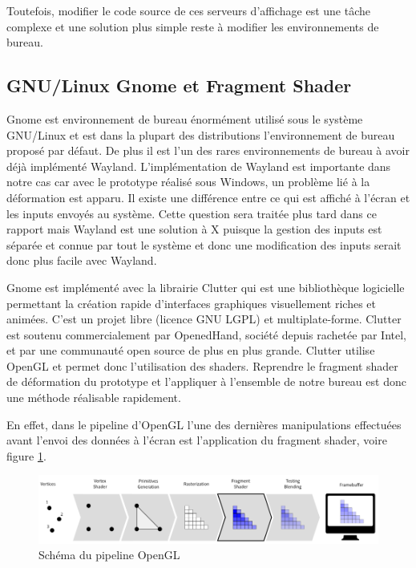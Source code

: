 Toutefois, modifier le code source de ces serveurs d'affichage est une tâche complexe et une solution plus simple reste à modifier les environnements de bureau.

\subsection{GNU/Linux Gnome et Fragment Shader}

Gnome est environnement de bureau énormément utilisé sous le système GNU/Linux et est dans la plupart des distributions l'environnement de bureau proposé par défaut. De plus il est l'un des rares environnements de bureau à avoir déjà implémenté Wayland. L'implémentation de Wayland est importante dans notre cas car avec le prototype réalisé sous Windows, un problème lié à la déformation est apparu. Il existe une différence entre ce qui est affiché à l'écran et les inputs envoyés au système. Cette question sera traitée plus tard dans ce rapport mais Wayland est une solution à X puisque la gestion des inputs est séparée et connue par tout le système et donc une modification des inputs serait donc plus facile avec Wayland.

Gnome est implémenté avec la librairie Clutter qui est une bibliothèque logicielle permettant la création rapide d'interfaces graphiques visuellement riches et animées. C'est un projet libre (licence GNU LGPL) et multiplate-forme. Clutter est soutenu commercialement par OpenedHand, société depuis rachetée par Intel, et par une communauté open source de plus en plus grande. Clutter utilise OpenGL et permet donc l'utilisation des shaders. Reprendre le fragment shader de déformation du prototype et l'appliquer à l'ensemble de notre bureau est donc une méthode réalisable rapidement.

En effet, dans le pipeline d'OpenGL l'une des dernières manipulations effectuées avant l'envoi des données à l'écran est l'application du fragment shader, voire figure \ref{fig:glPipeline}.

\begin{figure}[h!]
	\center	
	\includegraphics[scale=0.6]{image/glPipeline.png}
	\caption{Schéma du pipeline OpenGL}
	\label{fig:glPipeline}
\end{figure}


